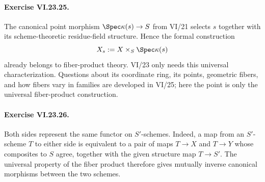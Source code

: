 \paragraph{Exercise VI.23.25.}
\begin{solution}
The canonical point morphism $\Spec\kappa(s)\to S$ from VI/21 selects $s$ together with its
scheme-theoretic residue-field structure.  Hence the formal construction
\[
X_s:=X\times_S\Spec\kappa(s)
\]
already belongs to fiber-product theory.  VI/23 only needs this universal characterization.
Questions about its coordinate ring, its points, geometric fibers, and how fibers vary in families
are developed in VI/25; here the point is only the universal fiber-product construction.
\end{solution}

\paragraph{Exercise VI.23.26.}
\begin{solution}
Both sides represent the same functor on \(S'\)-schemes. Indeed, a map from an
\(S'\)-scheme \(T\) to either side is equivalent to a pair of maps
\(T\to X\) and \(T\to Y\) whose composites to \(S\) agree, together with the
given structure map \(T\to S'\). The universal property of the fiber product
therefore gives mutually inverse canonical morphisms between the two schemes.
\end{solution}
